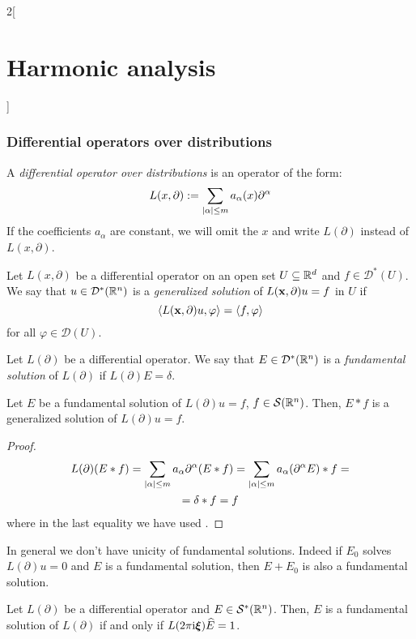 \documentclass[../../../main_math.tex]{subfiles}
\begin{document}
\begin{multicols}{2}[\section{Harmonic analysis}]
  \subsubsection{Differential operators over distributions}
  \begin{definition}
    A \emph{differential operator over distributions} is an operator of the form:
    $$
      L(x,\partial):=\sum_{\abs{\alpha}\leq m}a_\alpha(x)\partial^\alpha
    $$
    If the coefficients $a_\alpha$ are constant, we will omit the $x$ and write $L(\partial)$ instead of $L(x,\partial)$.
  \end{definition}
  \begin{definition}
    Let $L(x,\partial)$ be a differential operator on an open set $U\subseteq\mathbb{R}^d$ and $f\in \mathcal{D}^*(U)$. We say that $u\in\mathcal{D}^*(\mathbb{R}^n)$ is a \emph{generalized solution} of $L(\boldsymbol{\mathrm{x}},\partial)u=f$ in $U$ if
    $$
      \langle L(\boldsymbol{\mathrm{x}},\partial)u,\varphi\rangle=\langle f,\varphi\rangle
    $$
    for all $\varphi\in \mathcal{D}(U)$.
  \end{definition}
  \begin{definition}
    Let $L(\partial)$ be a differential operator. We say that $E\in\mathcal{D}^*(\mathbb{R}^n)$ is a \emph{fundamental solution} of $L(\partial)$ if $L(\partial)E=\delta$.
  \end{definition}
  \begin{theorem}
    Let $E$ be a fundamental solution of $L(\partial)u=f$, $f\in\mathcal{S}(\mathbb{R}^n)$. Then, $E*f$ is a generalized solution of $L(\partial)u=f$.
  \end{theorem}
  \begin{proof}
    \begin{multline*}
      L(\partial)(E*f)=\sum_{\abs{\alpha}\leq m}a_\alpha\partial^\alpha(E*f)=\sum_{\abs{\alpha}\leq m}a_\alpha(\partial^\alpha E)*f=\\=\delta*f=f
    \end{multline*}
    where in the last equality we have used .
  \end{proof}
  \begin{remark}
    In general we don't have unicity of fundamental solutions. Indeed if $E_0$ solves $L(\partial)u=0$ and $E$ is a fundamental solution, then $E+E_0$ is also a fundamental solution.
  \end{remark}
  \begin{theorem}
    Let $L(\partial)$ be a differential operator and $E\in\mathcal{S}^*(\mathbb{R}^n)$. Then, $E$ is a fundamental solution of $L(\partial)$ if and only if $L(2\pi\mathrm{i}\boldsymbol{\mathrm{\xi}})\widehat{E}=1$.

\end{theorem}
\end{multicols}
\end{document}
